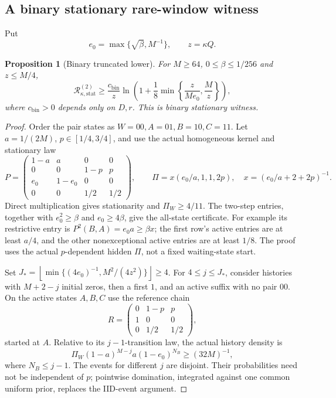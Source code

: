 \documentclass[11pt,letterpaper]{article}
\newtheorem{proposition}[theorem]{Proposition}
\theoremstyle{definition}\newtheorem{definition}[theorem]{Definition}
\theoremstyle{remark}\newtheorem{remark}[theorem]{Remark}
\newcommand{\floor}[1]{\left\lfloor #1\right\rfloor}
\newcommand{\Risk}{\mathcal{R}}
\begin{document}
\subsection{A binary stationary rare-window witness}
Put
\[
 e_0=\max\{\sqrt\beta,M^{-1}\},\qquad z=\kappa Q.
\]
\begin{proposition}[Binary truncated lower]\label{prop:binarylower}
For $M\ge64$, $0\le\beta\le1/256$ and $z\le M/4$,
\begin{equation}\label{eq:binarylower}
 \Risk_{\kappa,\mathrm{stat}}^{(2)}
 \ge\frac{c_{\mathrm{bin}}}{z}
 \ln\left(1+\frac18\min\left\{\frac{z}{Me_0},\frac Mz\right\}\right),
\end{equation}
where $c_{\mathrm{bin}}>0$ depends only on $D,r$. This is binary stationary witness.
\end{proposition}
\begin{proof}
Order the pair states as $W=00,A=01,B=10,C=11$. Let $a=1/(2M)$, $p\in[1/4,3/4]$, and use the actual homogeneous kernel and stationary law
\[
 P=\begin{pmatrix}
 1-a&a&0&0\\
 0&0&1-p&p\\
 e_0&1-e_0&0&0\\
 0&0&1/2&1/2
 \end{pmatrix},\qquad
 \Pi=x(e_0/a,1,1,2p),\quad x=(e_0/a+2+2p)^{-1}.
\]
Direct multiplication gives stationarity and $\Pi_W\ge4/11$. The two-step entries, together with $e_0^2\ge\beta$ and $e_0\ge4\beta$, give the all-state certificate. For example its restrictive entry is
$P^2(B,A)=e_0a\ge\beta x$; the first row's active entries are at least $a/4$, and the other nonexceptional active entries are at least $1/8$. The proof uses the actual $p$-dependent hidden $\Pi$, not a fixed waiting-state start.

Set $J_*=\floor{\min\{(4e_0)^{-1},M^2/(4z^2)\}}\ge4$.
For $4\le j\le J_*$, consider histories with $M+2-j$ initial zeros, then a first $1$, and an active suffix with no pair $00$. On the active states $A,B,C$ use the reference chain
\[
 R=\begin{pmatrix}0&1-p&p\\1&0&0\\0&1/2&1/2\end{pmatrix},
\]
started at $A$. Relative to its $j-1$-transition law, the actual history density is
\[
 \Pi_W(1-a)^{M-j}a(1-e_0)^{N_B}\ge(32M)^{-1},
\]
where $N_B\le j-1$. The events for different $j$ are disjoint. Their probabilities need not be independent of $p$; pointwise domination, integrated against one common uniform prior, replaces the IID-event argument.


\end{proof}
\end{document}
